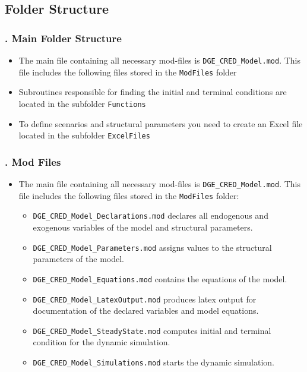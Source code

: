 \documentclass[11pt,aspectratio=169]{beamer}
\begin{document}
\subsection{Folder Structure}
\begin{frame}[plain]
\frametitle{{\thesection.\thesubsection} Main Folder Structure}
\begin{itemize}
\item The main file containing all necessary mod-files is {\tt DGE\_CRED\_Model.mod}. This file includes the following files stored in the {\tt ModFiles} folder
\item Subroutines responsible for finding the initial and terminal conditions are located in the subfolder {\tt Functions}
\item To define scenarios and structural parameters you need to create an Excel file located in the subfolder {\tt ExcelFiles}
\end{itemize}
\end{frame}


\begin{frame}[plain]
\frametitle{{\thesection.\thesubsection} Mod Files}
\begin{itemize}
\item The main file containing all necessary mod-files is {\tt DGE\_CRED\_Model.mod}. This file includes the following files stored in the {\tt ModFiles} folder:
\begin{itemize}
\item {\tt DGE\_CRED\_Model\_Declarations.mod} declares all endogenous and exogenous variables of the model and structural parameters.
\item {\tt DGE\_CRED\_Model\_Parameters.mod} assigns values to the structural parameters of the model.
\item {\tt DGE\_CRED\_Model\_Equations.mod} contains the equations of the model.
\item {\tt DGE\_CRED\_Model\_LatexOutput.mod} produces latex output for documentation of the declared variables and model equations.
\item {\tt DGE\_CRED\_Model\_SteadyState.mod} computes initial and terminal condition for the dynamic simulation.
\item {\tt DGE\_CRED\_Model\_Simulations.mod} starts the dynamic simulation.
\end{itemize}
\end{itemize}
\end{frame}
\end{document}
